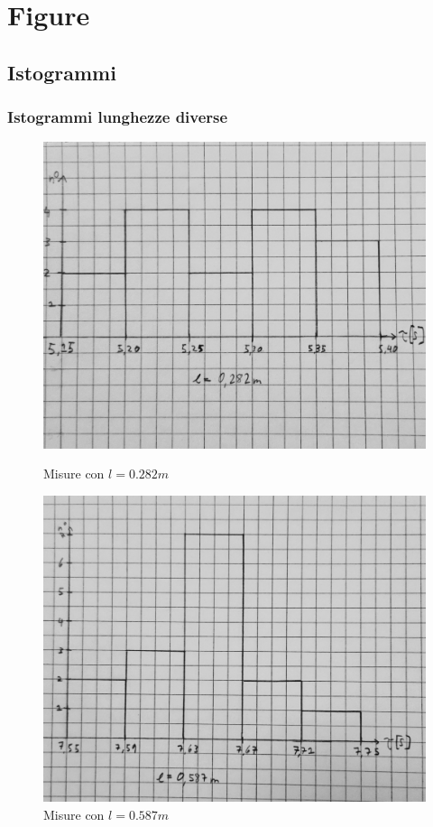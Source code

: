 \documentclass[a4paper]{article}
\begin{document}
\newpage
\section{Figure}
\subsection{Istogrammi}
\subsubsection{Istogrammi lunghezze diverse}
\begin{figure}[!h]
    \centering
    \begin{minipage}[b]{0.4\textwidth}
      \includegraphics[width=\textwidth]{fotopendolo/lunghezza_0282.jpg}
      \caption{Misure con $l=0.282m$}
    \end{minipage}
    \hfill
    \begin{minipage}[b]{0.4\textwidth}
      \includegraphics[width=\textwidth]{fotopendolo/lunghezza_0587.jpg}
      \caption{Misure con $l=0.587m$}
    \end{minipage}
  \end{figure}
\end{document}
